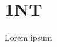 \documentclass[tom-ari]{subfile}
\begin{document}
	
	\chapter{1NT}
	
	Lorem ipsum
	
	\lipsum[4]
	
\end{document}
